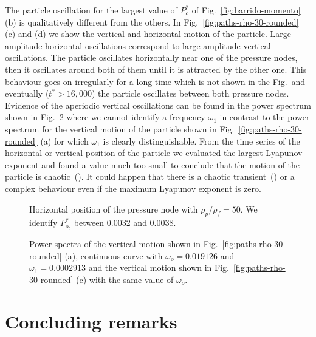 The particle oscillation for the largest value of $P_o^\ast$ of
Fig.~\ref{fig:barrido-momento} (b) is qualitatively different from the others.
In Fig.~\ref{fig:paths-rho-30-rounded} (c) and (d) we show the vertical and horizontal
motion of the particle. Large amplitude horizontal oscillations correspond to large 
amplitude vertical oscillations. The particle oscillates horizontally near one of the 
pressure nodes, then it oscillates around both of them until it is attracted by the other 
one. This behaviour goes on irregularly for a long time which is not shown in 
the Fig.~and eventually ($t^\ast>16,000$) the particle oscillates between both 
pressure nodes. Evidence of the aperiodic vertical oscillations can be found
in the power spectrum shown in Fig.~\ref{fig:fig-spectrums-rounded-first-last-Po-1} 
where we cannot identify a frequency $\omega_1$ in contrast to the power spectrum
for the vertical motion of the particle shown in Fig.~\ref{fig:paths-rho-30-rounded} (a) for 
which $\omega_1$ is clearly distinguishable. From the time series of the horizontal or 
vertical position of the particle we evaluated the largest Lyapunov exponent
and found a value much too small to conclude that the motion of the particle is 
chaotic~(\cite{tisean,kantzbook}). It could happen that there is a chaotic 
transient~(\cite{strogatzbook}) or a complex behaviour even if the maximum
Lyapunov exponent is zero. 
%
\begin{figure}

\caption{\label{fig:bifurcacion-rounded} Horizontal position of the pressure node 
 with $\rho_p/\rho_f=50$. We identify $P_{o_c}^\ast$ between 0.0032 and 0.0038.}
\end{figure}
%
\begin{figure}

\caption{ \label{fig:fig-spectrums-rounded-first-last-Po-1} Power spectra of the 
 vertical motion shown in Fig.~\ref{fig:paths-rho-30-rounded} (a), 
 continuous curve with $\omega_o =  0.019126$ and $\omega_1 = 0.0002913$ and
 the vertical motion shown in Fig.~\ref{fig:paths-rho-30-rounded} (c)
 with the same value of $\omega_o$.}
\end{figure}



\section{\label{sec:conclusions} Concluding remarks}


